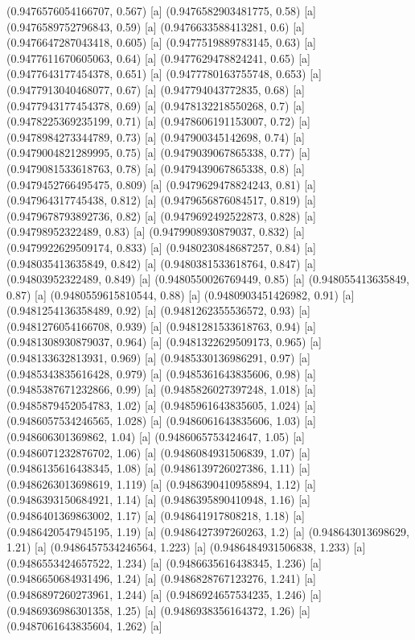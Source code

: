 {{{(0.9476576054166707, 0.567) [a] 
(0.9476582903481775, 0.58) [a] 
(0.9476589752796843, 0.59) [a] 
(0.9476633588413281, 0.6) [a] 
(0.9476647287043418, 0.605) [a] 
(0.9477519889783145, 0.63) [a] 
(0.9477611670605063, 0.64) [a] 
(0.9477629478824241, 0.65) [a] 
(0.9477643177454378, 0.651) [a] 
(0.9477780163755748, 0.653) [a] 
(0.9477913040468077, 0.67) [a] 
(0.947794043772835, 0.68) [a] 
(0.9477943177454378, 0.69) [a] 
(0.9478132218550268, 0.7) [a] 
(0.9478225369235199, 0.71) [a] 
(0.9478606191153007, 0.72) [a] 
(0.9478984273344789, 0.73) [a] 
(0.947900345142698, 0.74) [a] 
(0.9479004821289995, 0.75) [a] 
(0.9479039067865338, 0.77) [a] 
(0.9479081533618763, 0.78) [a] 
(0.9479439067865338, 0.8) [a] 
(0.9479452766495475, 0.809) [a] 
(0.9479629478824243, 0.81) [a] 
(0.947964317745438, 0.812) [a] 
(0.9479656876084517, 0.819) [a] 
(0.9479678793892736, 0.82) [a] 
(0.9479692492522873, 0.828) [a] 
(0.94798952322489, 0.83) [a] 
(0.9479908930879037, 0.832) [a] 
(0.9479922629509174, 0.833) [a] 
(0.9480230848687257, 0.84) [a] 
(0.948035413635849, 0.842) [a] 
(0.9480381533618764, 0.847) [a] 
(0.94803952322489, 0.849) [a] 
(0.9480550026769449, 0.85) [a] 
(0.948055413635849, 0.87) [a] 
(0.9480559615810544, 0.88) [a] 
(0.9480903451426982, 0.91) [a] 
(0.9481254136358489, 0.92) [a] 
(0.9481262355536572, 0.93) [a] 
(0.9481276054166708, 0.939) [a] 
(0.9481281533618763, 0.94) [a] 
(0.9481308930879037, 0.964) [a] 
(0.9481322629509173, 0.965) [a] 
(0.948133632813931, 0.969) [a] 
(0.9485330136986291, 0.97) [a] 
(0.9485343835616428, 0.979) [a] 
(0.9485361643835606, 0.98) [a] 
(0.9485387671232866, 0.99) [a] 
(0.9485826027397248, 1.018) [a] 
(0.9485879452054783, 1.02) [a] 
(0.9485961643835605, 1.024) [a] 
(0.9486057534246565, 1.028) [a] 
(0.9486061643835606, 1.03) [a] 
(0.948606301369862, 1.04) [a] 
(0.9486065753424647, 1.05) [a] 
(0.9486071232876702, 1.06) [a] 
(0.9486084931506839, 1.07) [a] 
(0.9486135616438345, 1.08) [a] 
(0.9486139726027386, 1.11) [a] 
(0.9486263013698619, 1.119) [a] 
(0.9486390410958894, 1.12) [a] 
(0.9486393150684921, 1.14) [a] 
(0.9486395890410948, 1.16) [a] 
(0.9486401369863002, 1.17) [a] 
(0.948641917808218, 1.18) [a] 
(0.9486420547945195, 1.19) [a] 
(0.9486427397260263, 1.2) [a] 
(0.948643013698629, 1.21) [a] 
(0.9486457534246564, 1.223) [a] 
(0.9486484931506838, 1.233) [a] 
(0.9486553424657522, 1.234) [a] 
(0.9486635616438345, 1.236) [a] 
(0.9486650684931496, 1.24) [a] 
(0.9486828767123276, 1.241) [a] 
(0.9486897260273961, 1.244) [a] 
(0.9486924657534235, 1.246) [a] 
(0.9486936986301358, 1.25) [a] 
(0.9486938356164372, 1.26) [a] 
(0.9487061643835604, 1.262) [a] 
}}}
